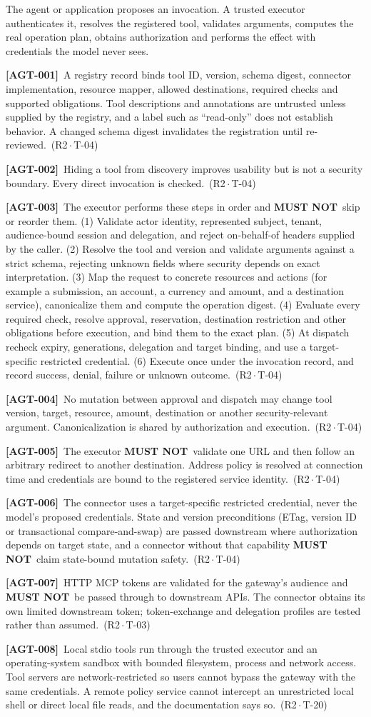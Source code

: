 \documentclass[11pt,a4paper]{article}
\newcommand{\mustnot}{\textbf{MUST NOT}}
\newcommand{\reqtag}[2]{{\footnotesize\color{accent}(#1\,$\cdot$\,#2)}}
\newcommand{\req}[4]{\par\noindent\hypertarget{req:#1}{\textbf{[#1]}}\ #4\ \reqtag{#2}{#3}\par}
\begin{document}
The agent or application proposes an invocation. A trusted executor authenticates it, resolves the registered tool, validates arguments, computes the real operation plan, obtains authorization and performs the effect with credentials the model never sees.
\req{AGT-001}{R2}{T-04}{A registry record binds tool ID, version, schema digest, connector implementation, resource mapper, allowed destinations, required checks and supported obligations. Tool descriptions and annotations are untrusted unless supplied by the registry, and a label such as ``read-only'' does not establish behavior. A changed schema digest invalidates the registration until re-reviewed.}
\req{AGT-002}{R2}{T-04}{Hiding a tool from discovery improves usability but is not a security boundary. Every direct invocation is checked.}
\req{AGT-003}{R2}{T-04}{The executor performs these steps in order and \mustnot\ skip or reorder them. (1) Validate actor identity, represented subject, tenant, audience-bound session and delegation, and reject on-behalf-of headers supplied by the caller. (2) Resolve the tool and version and validate arguments against a strict schema, rejecting unknown fields where security depends on exact interpretation. (3) Map the request to concrete resources and actions (for example a submission, an account, a currency and amount, and a destination service), canonicalize them and compute the operation digest. (4) Evaluate every required check, resolve approval, reservation, destination restriction and other obligations before execution, and bind them to the exact plan. (5) At dispatch recheck expiry, generations, delegation and target binding, and use a target-specific restricted credential. (6) Execute once under the invocation record, and record success, denial, failure or unknown outcome.}
\req{AGT-004}{R2}{T-04}{No mutation between approval and dispatch may change tool version, target, resource, amount, destination or another security-relevant argument. Canonicalization is shared by authorization and execution.}
\req{AGT-005}{R2}{T-04}{The executor \mustnot\ validate one URL and then follow an arbitrary redirect to another destination. Address policy is resolved at connection time and credentials are bound to the registered service identity.}
\req{AGT-006}{R2}{T-04}{The connector uses a target-specific restricted credential, never the model's proposed credentials. State and version preconditions (ETag, version ID or transactional compare-and-swap) are passed downstream where authorization depends on target state, and a connector without that capability \mustnot\ claim state-bound mutation safety.}
\req{AGT-007}{R2}{T-03}{HTTP MCP tokens are validated for the gateway's audience and \mustnot\ be passed through to downstream APIs. The connector obtains its own limited downstream token; token-exchange and delegation profiles are tested rather than assumed.}
\req{AGT-008}{R2}{T-20}{Local stdio tools run through the trusted executor and an operating-system sandbox with bounded filesystem, process and network access. Tool servers are network-restricted so users cannot bypass the gateway with the same credentials. A remote policy service cannot intercept an unrestricted local shell or direct local file reads, and the documentation says so.}
\end{document}
